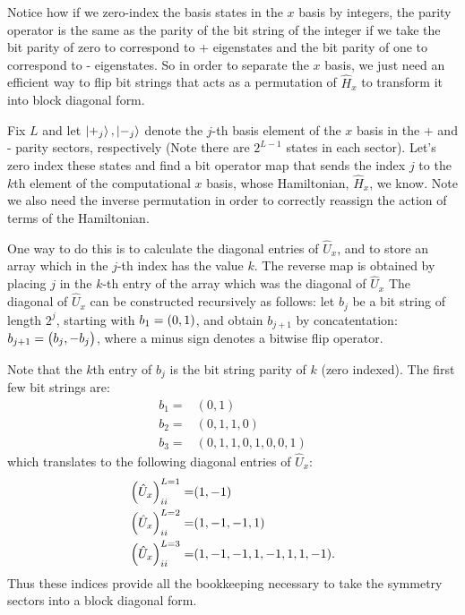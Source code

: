 \documentclass{article}
\begin{document}
Notice how if we zero-index the basis states in the $x$ basis by integers,
the parity operator is the same as the parity of the bit string of the integer
if we take the bit parity of zero to correspond to + eigenstates 
and the bit parity of one to correspond to - eigenstates.
So in order to separate the $x$ basis, we just need an efficient way to flip
bit strings that acts as a permutation of $\hat H_x$ to transform it into block
diagonal form.

Fix $L$ and let $\ket{+_j}, \ket{-_j}$ denote the $j$-th basis element of the
$x$ basis in the + and - parity sectors, respectively 
(Note there are $2^{L-1}$ states in each sector).
Let's zero index these states and find a bit operator map that sends the index
$j$ to the $k$th element of the computational $x$ basis, whose Hamiltonian,
$\hat H_x$, we know.
Note we also need the inverse permutation in order to correctly reassign the
action of terms of the Hamiltonian.

One way to do this is to calculate the diagonal entries of $\hat U_x$, 
and to store an array which in the $j$-th index has the value $k$.
The reverse map is obtained by placing $j$ in the $k$-th entry of the
array which was the diagonal of $\hat U_x$
The diagonal of $\hat U_x$ can be constructed recursively as follows:
let $b_j$ be a bit string of length $2^j$, starting with $b_1 = \qty( 0, 1 )$,
and obtain $b_{j+1}$ by concatentation: $b_{j+1} = \mqty( b_j, -b_j)$, where
a minus sign denotes a bitwise flip operator.

Note that the $k$th entry of $b_j$ is the bit string parity of $k$ (zero indexed).
The first few bit strings are:
\begin{align}
    b_1 =& (0, 1)
    \\
    b_2 =& (0, 1, 1, 0)
    \\
    b_3 =& (0, 1, 1, 0, 1, 0, 0, 1)
\end{align}
which translates to the following diagonal entries of $\hat U_x$:
\begin{align}
    \qty(\hat U_x)^{L=1}_{ii} =& (1, -1)
    \\
    \qty(\hat U_x)^{L=2}_{ii} =& (1, -1, -1, 1)
    \\
    \qty(\hat U_x)^{L=3}_{ii} =& (1, -1, -1, 1, -1, 1, 1, -1).
\end{align}
Thus these indices provide all the bookkeeping necessary to take the symmetry sectors
into a block diagonal form.
\end{document}
